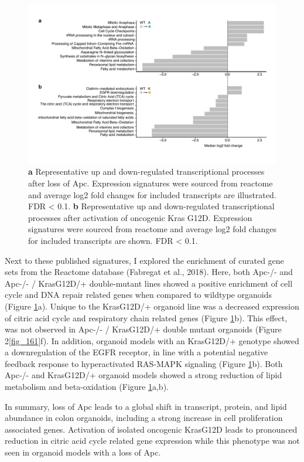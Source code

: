 \begin{flushleft}
 \begin{figure}[h]
\centering
\includegraphics[width=\textwidth,
                height=\textheight,
                keepaspectratio]{figures/adenomaprofiling/pdf/fig_1_6_2.pdf}
\caption{
\textbf{a} Representative up and down-regulated transcriptional processes after loss of Apc. Expression signatures were sourced from reactome and average log2 fold changes for included transcripts are illustrated. FDR < 0.1.
\textbf{b} Representative up and down-regulated transcriptional processes after activation of oncogenic Kras G12D. Expression signatures were sourced from reactome and average log2 fold changes for included transcripts are shown. FDR < 0.1.
}
\label{fig_162}
\end{figure}
\bigbreak


Next to these published signatures, I explored the enrichment of curated gene sets from the Reactome database (Fabregat et al., 2018). Here, both Apc-/- and Apc-/- / KrasG12D/+ double-mutant lines showed a positive enrichment of cell cycle and DNA repair related genes when compared to wildtype organoids (Figure \ref{fig_162}a). Unique to the KrasG12D/+ organoid line was a decreased expression of citric acid cycle and respiratory chain related genes (Figure \ref{fig_162}b). This effect, was not observed in Apc-/- / KrasG12D/+ double mutant organoids (Figure 2\ref{fig_161}f). In addition, organoid models with an KrasG12D/+ genotype showed a downregulation of the EGFR receptor, in line with a potential negative feedback response to hyperactivated RAS-MAPK signaling (Figure \ref{fig_162}b). Both Apc-/- and KrasG12D/+ organoid models showed a strong reduction of lipid metabolism and beta-oxidation (Figure \ref{fig_162}a,b).

In summary, loss of Apc leads to a global shift in transcript, protein, and lipid abundance in colon organoids, including a strong increase in cell proliferation associated genes. Activation of isolated oncogenic KrasG12D leads to pronounced reduction in citric acid cycle related gene expression while this phenotype was not seen in organoid models with a loss of Apc.


\end{flushleft}
